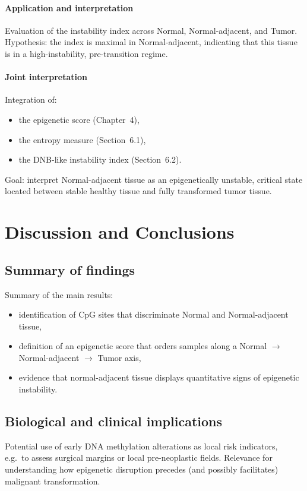 \documentclass[10pt]{extarticle}
\begin{document}
\paragraph{Application and interpretation}
Evaluation of the instability index across Normal, Normal-adjacent, and Tumor.  
Hypothesis: the index is maximal in Normal-adjacent, indicating that this tissue is in a high-instability, pre-transition regime.

\paragraph{Joint interpretation}
Integration of:
\begin{itemize}[label=-]
    \item the epigenetic score (Chapter~4),
    \item the entropy measure (Section~6.1),
    \item the DNB-like instability index (Section~6.2).
\end{itemize}
Goal: interpret Normal-adjacent tissue as an epigenetically unstable, critical state located between stable healthy tissue and fully transformed tumor tissue.


\section{Discussion and Conclusions}

\subsection{Summary of findings}
Summary of the main results:
\begin{itemize}[label=-]
    \item identification of CpG sites that discriminate Normal and Normal-adjacent tissue,
    \item definition of an epigenetic score that orders samples along a Normal $\rightarrow$ Normal-adjacent $\rightarrow$ Tumor axis,
    \item evidence that normal-adjacent tissue displays quantitative signs of epigenetic instability.
\end{itemize}

\subsection{Biological and clinical implications}
Potential use of early DNA methylation alterations as local risk indicators, e.g.\ to assess surgical margins or local pre-neoplastic fields.  
Relevance for understanding how epigenetic disruption precedes (and possibly facilitates) malignant transformation.
\end{document}

